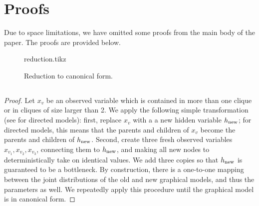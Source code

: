 \section{Proofs}
\label{app:proofs}

Due to space limitations, we have omitted some proofs from
the main body of the paper.  The proofs are provided below.

\begin{figure}
  \centering
  {reduction.tikz}
  \caption{Reduction to canonical form.}
  \label{fig:reduction}
\end{figure}

\subsection{}
\label{app:reduction-proof}
\begin{proof}
  \providecommand{\hp}{\ensuremath{h_\text{\rm new}}}
  Let $x_v$ be an observed variable which is contained in more than one clique
  or in cliques of size larger than 2.
  We apply the following simple transformation (see  for directed models):
  first, replace $x_v$ with a a new hidden variable \hp;
  for directed models, this means that the parents and children of $x_v$ become the parents and children of $\hp$.
  Second, create three fresh observed variables
  $x_{v_1},x_{v_2},x_{v_3}$, connecting them to $\hp$,
  and making all new nodes to deterministically take on identical values.
  We add three copies so that $\hp$ is guaranteed to be a bottleneck.
  By construction, there is a one-to-one mapping between the joint distributions
  of the old and new graphical models, and thus the parameters as well.
  We repeatedly apply this procedure until the graphical model is in canonical form.
\end{proof}


